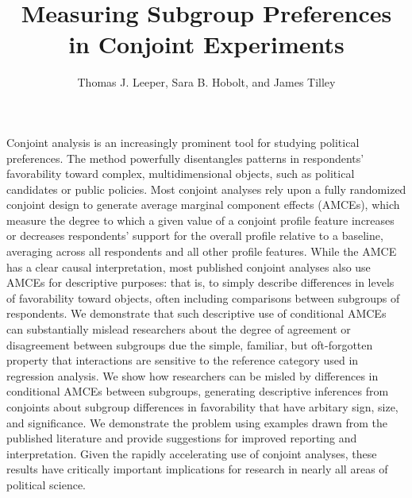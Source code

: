 \documentclass[a4paper,12pt]{article}\usepackage[]{graphicx}\usepackage[]{color}
\title{Measuring Subgroup Preferences in Conjoint Experiments}
\author{Thomas J. Leeper, Sara B. Hobolt, and James Tilley}
\begin{document}
\maketitle

{\abstract Conjoint analysis is an increasingly prominent tool for studying political preferences. The method powerfully disentangles patterns in respondents' favorability toward complex, multidimensional objects, such as political candidates or public policies. Most conjoint analyses rely upon a fully randomized conjoint design to generate average marginal component effects (AMCEs), which measure the degree to which a given value of a conjoint profile feature increases or decreases respondents' support for the overall profile relative to a baseline, averaging across all respondents and all other profile features. While the AMCE has a clear causal interpretation, most published conjoint analyses also use AMCEs for descriptive purposes: that is, to simply describe differences in levels of favorability toward objects, often including comparisons between subgroups of respondents. We demonstrate that such descriptive use of conditional AMCEs can substantially mislead researchers about the degree of agreement or disagreement between subgroups due the simple, familiar, but oft-forgotten property that interactions are sensitive to the reference category used in regression analysis. We show how researchers can be misled by differences in conditional AMCEs between subgroups, generating descriptive inferences from conjoints about subgroup differences in favorability that have arbitary sign, size, and significance. We demonstrate the problem using examples drawn from the published literature and provide suggestions for improved reporting and interpretation. Given the rapidly accelerating use of conjoint analyses, these results have critically important implications for research in nearly all areas of political science.}

















\clearpage
\end{document}
